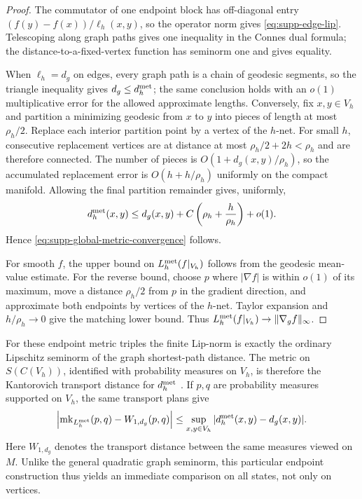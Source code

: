 \documentclass[11pt]{article}
\theoremstyle{definition}
\theoremstyle{remark}
\theoremstyle{definition}
\theoremstyle{remark}
\begin{document}
\begin{proof}
The commutator of one endpoint block has off-diagonal entry
$(f(y)-f(x))/\ell_h(x,y)$, so the operator norm gives
\eqref{eq:supp-edge-lip}.  Telescoping along graph paths gives one inequality in the
Connes dual formula; the distance-to-a-fixed-vertex function has seminorm one and
gives equality.

When $\ell_h=d_g$ on edges, every graph path is a chain of geodesic segments,
so the triangle inequality gives $d_g\le d_h^{\rm met}$; the same conclusion
holds with an $o(1)$ multiplicative error for the allowed approximate lengths.
Conversely, fix $x,y\in V_h$ and partition a minimizing geodesic from $x$ to $y$
into pieces of length at most $\rho_h/2$.  Replace each interior partition point
by a vertex of the $h$-net.  For small $h$, consecutive replacement vertices are
at distance at most $\rho_h/2+2h<\rho_h$ and are therefore connected.  The number
of pieces is $O(1+d_g(x,y)/\rho_h)$, so the accumulated replacement error is
$O(h+h/\rho_h)$ uniformly on the compact manifold.  Allowing the final
partition remainder gives, uniformly,
\[
 d_h^{\rm met}(x,y)
 \le d_g(x,y)+C\left(\rho_h+\frac h{\rho_h}\right)+o(1).
\]
Hence \eqref{eq:supp-global-metric-convergence} follows.

For smooth $f$, the upper bound on $L_h^{\rm met}(f|_{V_h})$ follows from the
geodesic mean-value estimate.  For the reverse bound, choose $p$ where
$|\nabla f|$ is within $o(1)$ of its maximum, move a distance $\rho_h/2$ from
$p$ in the gradient direction, and approximate both endpoints by vertices of
the $h$-net.  Taylor expansion and $h/\rho_h\to0$ give the matching lower bound.
Thus $L_h^{\rm met}(f|_{V_h})\to\|\nabla_gf\|_\infty$.
\end{proof}

For these endpoint metric triples the finite Lip-norm is exactly the
ordinary Lipschitz seminorm of the graph shortest-path distance.  The metric
on $S(C(V_h))$, identified with probability measures on $V_h$, is therefore
the Kantorovich transport distance for $d_h^{\rm met}$
\cite{Rieffel1999}.  If $p,q$ are probability measures supported on $V_h$,
the same transport plans give
\[
 \left|\operatorname{mk}_{L_h^{\rm met}}(p,q)-W_{1,d_g}(p,q)\right|
 \le\sup_{x,y\in V_h}|d_h^{\rm met}(x,y)-d_g(x,y)|.
\]
Here $W_{1,d_g}$ denotes the transport distance between the same measures
viewed on $M$.  Unlike the general quadratic graph seminorm, this particular
endpoint construction thus yields an immediate comparison on all states,
not only on vertices.
\end{document}

